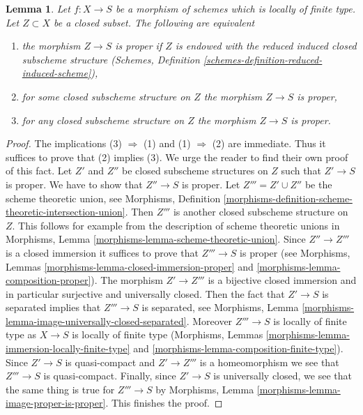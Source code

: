 \documentclass[10pt,a4paper]{amsart}
\theoremstyle{plain}
\newtheorem{lemma}[subsection]{Lemma}
\theoremstyle{definition}
\theoremstyle{remark}
\numberwithin{equation}{subsection}
\begin{document}
\begin{lemma}
\label{lemma-closed-proper-over-base}
Let $f : X \to S$ be a morphism of schemes which is locally of finite type.
Let $Z \subset X$ be a closed subset. The following are equivalent
\begin{enumerate}
\item the morphism $Z \to S$ is proper if $Z$ is endowed with the reduced
induced closed subscheme structure
(Schemes, Definition \ref{schemes-definition-reduced-induced-scheme}),
\item for some closed subscheme structure on $Z$ the morphism $Z \to S$
is proper,
\item for any closed subscheme structure on $Z$ the morphism
$Z \to S$ is proper.
\end{enumerate}
\end{lemma}

\begin{proof}
The implications (3) $\Rightarrow$ (1) and (1) $\Rightarrow$ (2)
are immediate. Thus it suffices to prove that (2) implies (3).
We urge the reader to find their own proof of this fact.
Let $Z'$ and $Z''$ be closed subscheme structures on $Z$
such that $Z' \to S$ is proper. We have to show that $Z'' \to S$ is proper.
Let $Z''' = Z' \cup Z''$ be the scheme theoretic union, see
Morphisms, Definition
\ref{morphisms-definition-scheme-theoretic-intersection-union}.
Then $Z'''$ is another closed subscheme structure on $Z$.
This follows for example from the description of scheme theoretic unions in
Morphisms, Lemma \ref{morphisms-lemma-scheme-theoretic-union}.
Since $Z'' \to Z'''$ is a closed immersion it suffices to prove
that $Z''' \to S$ is proper (see
Morphisms, Lemmas \ref{morphisms-lemma-closed-immersion-proper} and
\ref{morphisms-lemma-composition-proper}).
The morphism $Z' \to Z'''$ is a bijective closed immersion
and in particular surjective and universally closed.
Then the fact that $Z' \to S$ is separated implies that
$Z''' \to S$ is separated, see
Morphisms, Lemma \ref{morphisms-lemma-image-universally-closed-separated}.
Moreover $Z''' \to S$ is locally of finite type
as $X \to S$ is locally of finite type
(Morphisms, Lemmas \ref{morphisms-lemma-immersion-locally-finite-type} and
\ref{morphisms-lemma-composition-finite-type}).
Since $Z' \to S$ is quasi-compact and $Z' \to Z'''$ is a homeomorphism
we see that $Z''' \to S$ is quasi-compact.
Finally, since $Z' \to S$ is universally closed, we see that
the same thing is true for $Z''' \to S$ by
Morphisms, Lemma \ref{morphisms-lemma-image-proper-is-proper}.
This finishes the proof.
\end{proof}
\end{document}
